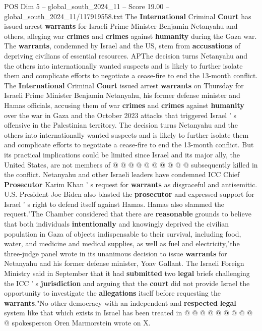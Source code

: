 \begin{textsample}{POS Dim 5 – global\_south\_2024\_11 – Score 19.00 – global\_south\_2024\_11/117919558.txt}  \label{ex:f5_pos_026}
The \textbf{International} Criminal \textbf{Court} has issued arrest \textbf{warrants} for Israeli Prime Minister Benjamin Netanyahu and others, alleging war \textbf{crimes} and \textbf{crimes} against \textbf{humanity} during the Gaza war.
The \textbf{warrants}, condemned by Israel and the US, stem from \textbf{accusations} of depriving civilians of essential resources.
APThe decision turns Netanyahu and the others into internationally wanted suspects and is likely to further isolate them and complicate efforts to negotiate a cease-fire to end the 13-month conflict.
The \textbf{International} Criminal \textbf{Court} issued arrest \textbf{warrants} on Thursday for Israeli Prime Minister Benjamin Netanyahu, his former defense minister and Hamas officials, accusing them of war \textbf{crimes} and \textbf{crimes} against \textbf{humanity} over the war in Gaza and the October 2023 attacks that triggered Israel ' s offensive in the Palestinian territory.
The decision turns Netanyahu and the others into internationally wanted suspects and is likely to further isolate them and complicate efforts to negotiate a cease-fire to end the 13-month conflict.
But its practical implications could be limited since Israel and its major ally, the United States, are not members of @ @ @ @ @ @ @ @ @ @ subsequently killed in the conflict.
Netanyahu and other Israeli leaders have condemned ICC Chief \textbf{Prosecutor} Karim Khan ' s request for \textbf{warrants} as disgraceful and antisemitic.
U.S.
President Joe Biden also blasted the \textbf{prosecutor} and expressed support for Israel ' s right to defend itself against Hamas.
Hamas also slammed the request."The Chamber considered that there are \textbf{reasonable} grounds to believe that both individuals \textbf{intentionally} and knowingly deprived the civilian population in Gaza of objects indispensable to their survival, including food, water, and medicine and medical supplies, as well as fuel and electricity,"the three-judge panel wrote in its unanimous decision to issue \textbf{warrants} for Netanyahu and his former defense minister, Yoav Gallant.
The Israeli Foreign Ministry said in September that it had \textbf{submitted} two \textbf{legal} briefs challenging the ICC ' s \textbf{jurisdiction} and arguing that the \textbf{court} did not provide Israel the opportunity to investigate the \textbf{allegations} itself before requesting the \textbf{warrants}."No other democracy with an independent and \textbf{respected} \textbf{legal} system like that which exists in Israel has been treated in @ @ @ @ @ @ @ @ @ @ spokesperson Oren Marmorstein wrote on X.

\end{textsample}
